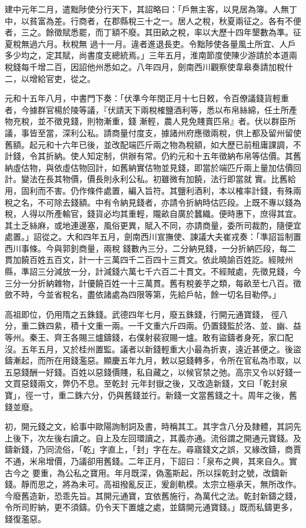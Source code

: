 \begin{pinyinscope}
 建中元年二月，遣黜陟使分行天下，其詔略曰：「戶無主客，以見居為簿。人無丁中，以貧富為差。行商者，在郡縣稅三十之一。居人之稅，秋夏兩征之。各有不便者，三之。餘徵賦悉罷，而丁額不廢。其田畝之稅，率以大歷十四年墾數為準。征夏稅無過六月。秋稅無
 過十一月。違者進退長吏。令黜陟使各量風土所宜、人戶多少均之，定其賦，尚書度支總統焉。」三年五月，淮南節度使陳少游請於本道兩稅錢每千增二百，因詔他州悉如之。八年四月，劍南西川觀察使韋皋奏請加稅什二，以增給官吏，從之。



 元和十五年八月，中書門下奏：「伏準今年閏正月十七日敕，令百僚議錢貨輕重者，今據群官楊於陵等議，『伏請天下兩稅榷鹽酒利等，悉以布帛絲綿，任土所產物充稅，並不徵見錢，則物漸重，錢
 漸輕，農人見免賤賣匹帛』者。伏以群臣所議，事皆至當，深利公私。請商量付度支，據諸州府應徵兩稅，供上都及留州留使舊額。起元和十六年已後，並改配端匹斤兩之物為稅額，如大歷已前租庸課調，不計錢，令其折納。使人知定制，供辦有常。仍約元和十五年徵納布帛等估價。其舊納虛估物，與依虛估物回計，如舊納實估物並見錢，即當於端匹斤兩上量加估價回計。變法在長其物價，價長則永利公私。初雖微有加饒，法行即當就
 實。比舊給用，固利而不害。仍作條件處置，編入旨符。其鹽利酒利，本以榷率計錢，有殊兩稅之名，不可除去錢額。中有令納見錢者，亦請令折納時估匹段。上既不專以錢為稅，人得以所產輸官，錢貨必均其重輕，隴畝自廣於蠶織。便時惠下，庶得其宜。其土乏絲麻，或地連邊塞，風俗更異，賦入不同，亦請商量，委所司裁酌，隨便宜處置。」詔從之。大和四年五月，劍南西川宣撫使、諫議大夫崔戎奏：「準詔旨制置西川事條。今與郭釗商量，兩稅
 錢數內三分，二分納見錢，一分折納匹段，每二貫加饒百姓五百文，計一十三萬四千二百四十三貫文。依此曉諭百姓訖。經賊州縣，準詔三分減放一分，計減錢六萬七千六百二十貫文。不經賊處，先徵見錢，今三分一分折納雜物，計優饒百姓一十三萬貫。舊有稅姜芋之類，每畝至七八百。徵斂不時，今並省稅名，盡依諸處為四限等第，先給戶帖，餘一切名目勒停。」



 高祖即位，仍用隋之五銖錢。武德四年七月，廢五銖錢，行開元通寶錢，
 徑八分，重二銖四絫，積十文重一兩。一千文重六斤四兩。仍置錢監於洛、並、幽、益等州。秦王、齊王各賜三爐鑄錢，右僕射裴寂賜一爐。敢有盜鑄者身死，家口配沒。五年五月，又於桂州置監。議者以新錢輕重大小最為折衷，遠近甚便之。後盜鑄漸起，而所在用錢濫惡。顯慶五年九月，敕以惡錢轉多，令所在官私為市取，以五惡錢酬一好錢。百姓以惡錢價賤，私自藏之，以候官禁之弛。高宗又令以好錢一文買惡錢兩文，弊仍不息。至乾封
 元年封嶽之後，又改造新錢，文曰「乾封泉寶」，徑一寸，重二銖六分，仍與舊錢並行。新錢一文當舊錢之十。周年之後，舊錢並廢。



 初，開元錢之文，給事中歐陽詢制詞及書，時稱其工。其字含八分及隸體，其詞先上後下，次左後右讀之。自上及左回環讀之，其義亦通。流俗謂之開通元寶錢。及鑄新錢，乃同流俗，「乾」字直上，「封」字在左。尋寤錢文之誤，又緣改鑄，商賈不通，米帛增價，乃議卻用舊錢。二年正月，下詔曰：「泉布之興，其來自久。實古今之
 要重，為公私之寶用。年月既深，偽濫斯起，所以採乾封之號，改鑄新錢。靜而思之，將為未可。高祖撥亂反正，爰創軌模。太宗立極承天，無所改作。今廢舊造新，恐乖先旨。其開元通寶，宜依舊施行，為萬代之法。乾封新鑄之錢，令所司貯納，更不須鑄。仍令天下置爐之處，並鑄開元通寶錢。」既而私鑄更多，錢復濫惡。




\end{pinyinscope}
